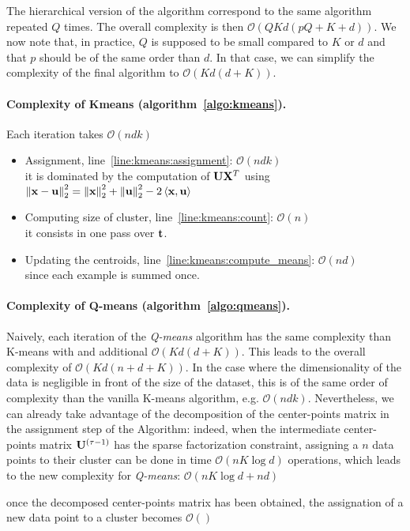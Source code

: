 The hierarchical version of the algorithm correspond to the same algorithm repeated $Q$ times. The overall complexity is then $\mathcal{O}(QKd(pQ+K+d))$. We now note that, in practice, $Q$ is supposed to be small compared to $K$ or $d$ and that $p$ should be of the same order than $d$. In that case, we can simplify the complexity of the final algorithm to $\mathcal{O}(Kd(d+K))$.

\paragraph{Complexity of Kmeans (algorithm~\ref{algo:kmeans}).}
Each iteration takes $\mathcal{O}\left (ndk\right )$
\begin{itemize}
\item Assignment, line~\ref{line:kmeans:assignment}: $\mathcal{O}\left (ndk\right )$\\
it is dominated by the computation of ${\mathbf{U}} {\mathbf{X}}^T$ using $\left \|{\mathbf{x}}-{\mathbf{u}}\right \|_2^2=\left \|{\mathbf{x}}\right \|_2^2+\left \|{\mathbf{u}}\right \|_2^2-2\left <{\mathbf{x}}, {\mathbf{u}}\right >$
\item Computing size of cluster, line~\ref{line:kmeans:count}: $\mathcal{O}\left (n \right )$\\
it consists in one pass over ${\mathbf{t}}$.
\item Updating the centroids, line~\ref{line:kmeans:compute_means}: $\mathcal{O}\left (nd\right )$\\
since each example is summed once.
\end{itemize}

\paragraph{Complexity of Q-means (algorithm~\ref{algo:qmeans}).}

Naively, each iteration of the \textit{Q-means} algorithm has the same complexity than K-means with and additional $\mathcal{O}(Kd(d+K))$. This leads to the overall complexity of $\mathcal{O}(Kd(n+ d+K))$. In the case where the dimensionality of the data is negligible in front of the size of the dataset, this is of the same order of complexity than the vanilla K-means algorithm, e.g. $\mathcal{O}(ndk)$. Nevertheless, we can already take advantage of the decomposition of the center-points matrix in the assignment step of the Algorithm: indeed, when the intermediate center-points matrix ${\mathbf{U}}^{(\tau-1)}$ has the sparse factorization constraint, assigning a $n$ data points to their cluster can be done in time $\mathcal{O}(n K \log d)$ operations, which leads to the new complexity for \textit{Q-means}: $\mathcal{O}(nK\log d + nd)$

once the decomposed center-points matrix has been obtained, the assignation of a new data point to a cluster becomes $\mathcal{O}()$
